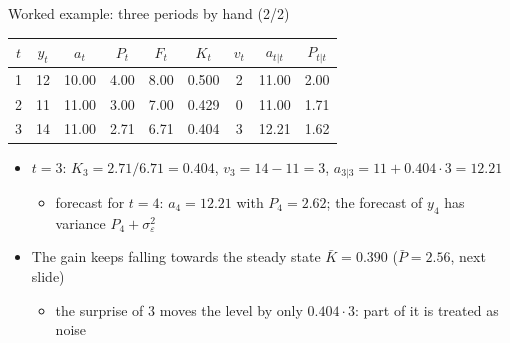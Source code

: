 \begin{frame}{Worked example: three periods by hand (2/2)}
\itemsize{\small}
\begin{center}
\footnotesize
\begin{tabular}{ccccccccc}
\toprule
$t$ & $y_t$ & $a_t$ & $P_t$ & $F_t$ & $K_t$ & $v_t$ & $a_{t|t}$ & $P_{t|t}$ \\
\midrule
1 & 12 & 10.00 & 4.00 & 8.00 & 0.500 & 2 & 11.00 & 2.00 \\
2 & 11 & 11.00 & 3.00 & 7.00 & 0.429 & 0 & 11.00 & 1.71 \\
3 & 14 & 11.00 & 2.71 & 6.71 & 0.404 & 3 & 12.21 & 1.62 \\
\bottomrule
\end{tabular}
\end{center}
\begin{itemize}
    \item $t = 3$: $K_3 = 2.71/6.71 = 0.404$, $v_3 = 14 - 11 = 3$, $a_{3|3} = 11 + 0.404 \cdot 3 = 12.21$
    \begin{itemize}
        \item forecast for $t = 4$: $a_4 = 12.21$ with $P_4 = 2.62$; the forecast of $y_4$ has variance $P_4 + \sigma^2_\varepsilon$
    \end{itemize}
    \item The gain keeps falling towards the steady state $\bar K = 0.390$ ($\bar P = 2.56$, next slide)
    \begin{itemize}
        \item the surprise of 3 moves the level by only $0.404 \cdot 3$: part of it is treated as noise
    \end{itemize}
\end{itemize}
\end{frame}

